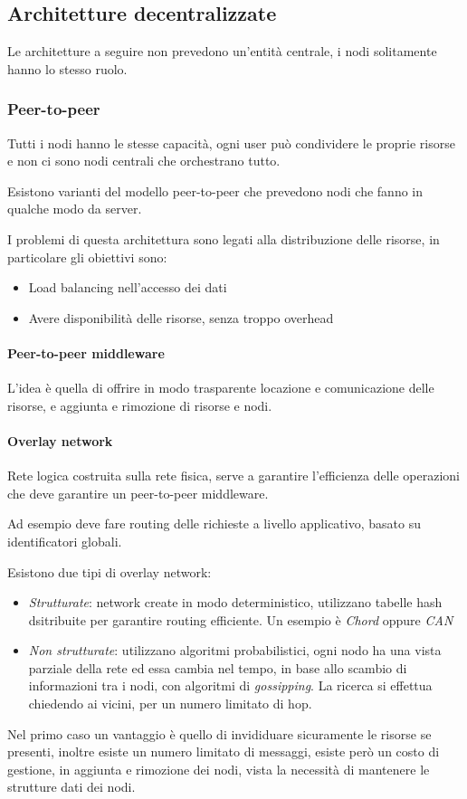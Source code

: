 \subsection{Architetture decentralizzate}
Le architetture a seguire non prevedono un'entità centrale, i nodi solitamente 
hanno lo stesso ruolo.

\subsubsection{Peer-to-peer}
Tutti i nodi hanno le stesse capacità, ogni user può condividere le proprie
risorse e non ci sono nodi centrali che orchestrano tutto.

Esistono varianti del modello peer-to-peer che prevedono nodi che fanno in 
qualche modo da server.

I problemi di questa architettura sono legati alla distribuzione delle risorse, 
in particolare gli obiettivi sono:
\begin{itemize}
    \item Load balancing nell'accesso dei dati
    \item Avere disponibilità delle risorse, senza troppo overhead
\end{itemize}

\paragraph{Peer-to-peer middleware}
L'idea è quella di offrire in modo trasparente locazione e comunicazione 
delle risorse, e aggiunta e rimozione di risorse e nodi.

\paragraph{Overlay network}
Rete logica costruita sulla rete fisica, serve a garantire l'efficienza
delle operazioni che deve garantire un peer-to-peer middleware.

Ad esempio deve fare routing delle richieste a livello applicativo, 
basato su identificatori globali.

Esistono due tipi di overlay network:
\begin{itemize}
    \item \emph{Strutturate}: network create in modo deterministico, utilizzano 
    tabelle hash dsitribuite per garantire routing efficiente. 
    Un esempio è \emph{Chord} oppure \emph{CAN}
    \item \emph{Non strutturate}: utilizzano algoritmi probabilistici, 
    ogni nodo ha una vista parziale della rete ed essa cambia nel tempo, 
    in base allo scambio di informazioni tra i nodi, con algoritmi di \emph{gossipping}.
    La ricerca si effettua chiedendo ai vicini, per un numero limitato di hop.
\end{itemize}
Nel primo caso un vantaggio è quello di invididuare sicuramente le risorse se presenti,
inoltre esiste un numero limitato di messaggi, esiste però un costo di gestione, 
in aggiunta e rimozione dei nodi, vista la necessità di mantenere le strutture 
dati dei nodi.

